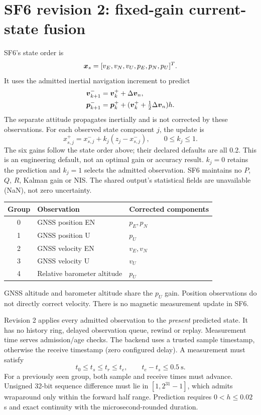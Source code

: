 \section{SF6 revision 2: fixed-gain current-state fusion}
\label{sec:sf6}
SF6's state order is
\begin{equation}
\boldsymbol{x}_s=[v_E,v_N,v_U,p_E,p_N,p_U]^T.
\end{equation}
It uses the admitted inertial navigation increment to predict
\begin{align}
\boldsymbol{v}^-_{k+1}&=\boldsymbol{v}^+_k+\Delta\boldsymbol{v}_n,\\
\boldsymbol{p}^-_{k+1}&=\boldsymbol{p}^+_k+(\boldsymbol{v}^+_k+\tfrac12\Delta\boldsymbol{v}_n)h.
\end{align}
The separate attitude propagates inertially and is not corrected by these observations. For each observed state component $j$, the update is
\begin{equation}
x_{s,j}^{+}=x_{s,j}^{-}+k_j(z_j-x_{s,j}^{-}),\qquad0\le k_j\le1.
\label{eq:sf6-gain}
\end{equation}
The six gains follow the state order above; their declared defaults are all 0.2. This is an engineering default, not an optimal gain or accuracy result. $k_j=0$ retains the prediction and $k_j=1$ selects the admitted observation. SF6 maintains no $P$, $Q$, $R$, Kalman gain or NIS. The shared output's statistical fields are unavailable (NaN), not zero uncertainty.

\begin{center}
\begin{tabular}{@{}cll@{}}
\toprule Group & Observation & Corrected components \\
\midrule
0 & GNSS position EN & $p_E,p_N$ \\
1 & GNSS position U & $p_U$ \\
2 & GNSS velocity EN & $v_E,v_N$ \\
3 & GNSS velocity U & $v_U$ \\
4 & Relative barometer altitude & $p_U$ \\
\bottomrule
\end{tabular}
\end{center}
GNSS altitude and barometer altitude share the $p_U$ gain. Position observations do not directly correct velocity. There is no magnetic measurement update in SF6.

Revision 2 applies every admitted observation to the \emph{present} predicted state. It has no history ring, delayed observation queue, rewind or replay. Measurement time serves admission/age checks. The backend uses a trusted sample timestamp, otherwise the receive timestamp (zero configured delay). A measurement must satisfy
\begin{equation}
t_0\le t_s\le t_r\le t_e,\qquad t_e-t_s\le0.5\ \mathrm{s}.
\end{equation}
For a previously seen group, both sample and receive times must advance. Unsigned 32-bit sequence difference must lie in $[1,2^{31}-1]$, which admits wraparound only within the forward half range. Prediction requires $0<h\le0.02$ s and exact continuity with the microsecond-rounded duration.

